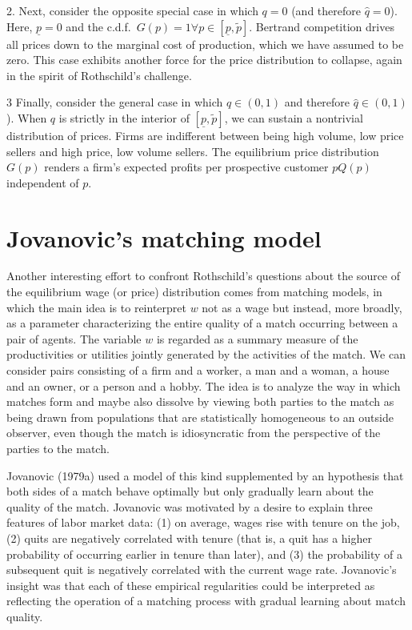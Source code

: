 \item{2.} Next, consider the opposite special case in which $q=0$ (and therefore $\hat q = 0$).  Here, $\underline p = 0$ and the c.d.f.\  $G(p) = 1 \forall p \in [\underline p, \tilde p]$.
Bertrand competition drives all prices down to the marginal cost of production, which we have assumed to be zero.
  This case exhibits another force for the price distribution
to collapse, again in the spirit of Rothschild's challenge. %

\item{3} Finally, consider the general case in which $q \in (0, 1)$ and therefore $\hat q \in (0,1)$).  When $q$ is strictly in the interior of $[\underline p, \tilde p]$, we can sustain a nontrivial
distribution of prices.  Firms are indifferent between being high volume, low price sellers and high price, low volume sellers.
The equilibrium price distribution $G(p)$ renders a firm's expected profits per prospective customer $p Q(p)$ independent
of $p$.


\medskip

\section{Jovanovic's matching model}\label{sec:Jov}%
Another  interesting effort to confront Rothschild's questions about the source of the equilibrium wage (or price) distribution
comes  from matching models, in which the main idea is to
reinterpret $w$ not as a wage but instead, more broadly, as a parameter
characterizing the entire quality of a match occurring between a pair of
agents.  The variable $w$ is regarded as a summary measure of the
productivities or utilities jointly generated by the activities of the match.
We can consider pairs consisting of  a firm and a worker, a man and a woman, a
house and an owner, or a person and a hobby.  The idea is to analyze the way in
which matches form and maybe also dissolve by viewing both parties to the match
as being drawn from populations that are statistically homogeneous to an
outside observer, even though the match is idiosyncratic from the perspective
of the parties to the match.

Jovanovic (1979a)  used a model of this kind supplemented by an hypothesis that both
sides of a match behave optimally but only gradually learn about the quality
of the match.  Jovanovic was motivated by a desire to explain three features of
labor market data: (1) on average, wages rise with tenure on the job, (2) quits
are negatively correlated with tenure (that is, a quit has a higher probability
of occurring earlier in tenure than later), and (3) the probability of a
subsequent quit is negatively correlated with the current wage rate.
Jovanovic's insight was that each of these empirical regularities could be
interpreted as reflecting the operation of a matching process with gradual
learning about match quality.

